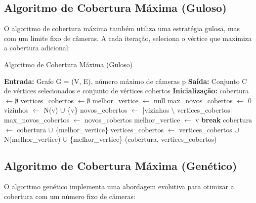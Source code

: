 \documentclass[12pt, a4paper]{report}
\begin{document}
\subsection{Algoritmo de Cobertura Máxima (Guloso)}
O algoritmo de cobertura máxima também utiliza uma estratégia gulosa, mas com um limite fixo de câmeras. A cada iteração, seleciona o vértice que maximiza a cobertura adicional:

\begin{algorithm}[H]
\caption{Algoritmo de Cobertura Máxima (Guloso)}
\begin{algorithmic}[1]
\State \textbf{Entrada:} Grafo G = (V, E), número máximo de câmeras p
\State \textbf{Saída:} Conjunto C de vértices selecionados e conjunto de vértices cobertos
\Statex
\State \textbf{Inicialização:}
\State cobertura $\gets \emptyset$
\State vertices\_cobertos $\gets \emptyset$
\Statex
{}
    \State melhor\_vertice $\gets$ null
    \State max\_novos\_cobertos $\gets$ 0
            \State vizinhos $\gets$ N(v) $\cup$ \{v\}
            \State novos\_cobertos $\gets$ |vizinhos $\setminus$ vertices\_cobertos|
                \State max\_novos\_cobertos $\gets$ novos\_cobertos
                \State melhor\_vertice $\gets$ v
            \EndIf
        \EndIf
    \EndFor
        \State \textbf{break}
    \EndIf
    \State cobertura $\gets$ cobertura $\cup$ \{melhor\_vertice\}
    \State vertices\_cobertos $\gets$ vertices\_cobertos $\cup$ N(melhor\_vertice) $\cup$ \{melhor\_vertice\}
\EndFor
\State \Return (cobertura, vertices\_cobertos)
\end{algorithmic}
\end{algorithm}

\subsection{Algoritmo de Cobertura Máxima (Genético)}
O algoritmo genético implementa uma abordagem evolutiva para otimizar a cobertura com um número fixo de câmeras:
\end{document}
